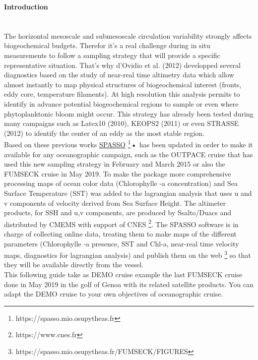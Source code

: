 \documentclass[12pt,a4paper]{article}
\begin{document}
{\textbf{\fontsize{19}{40}\selectfont Introduction}} \\
\\
\\
The horizontal mesoscale and submesoscale circulation variability strongly affects biogeochemical budgets. Therefor it's a real challenge during in situ measurements to follow a sampling strategy that will provide a specific representative situation. 
That's why d'Ovidio et al. (2012) developped several diagnostics based on the study of near-real time altimetry data which allow almost instantly to map physical structures of biogeochemical interest (fronts, eddy core, temperature filaments). At high resolution this analysis permits to identify in advance potential biogeochemical regions to sample or even where phytoplanktonic bloom might occur. This strategy has already been tested during many campaigns such as Latex10 (2010), KEOPS2 (2011) or even STRASSE (2012) to identify the center of an eddy as the most stable region.\\
Based on these previous works \href{https://spasso.mio.osupytheas.fr/}{SPASSO} \footnote{https://spasso.mio.osupytheas.fr}\textbf{•} has been updated in order to make it available for any oceanographic campaign, such as the OUTPACE cruise that has used this new sampling strategy in February and March 2015 or also the FUMSECK cruise in May 2019. To make the package more comprehensive processing maps of ocean color data (Chlorophylle -a concentration) and Sea Surface Temperature (SST) was added to the lagrangian analysis that uses u and v components of velocity derived from Sea Surface Height. The altimeter products, for SSH and u,v components, are produced by Ssalto/Duacs and distributed by CMEMS with support of CNES \footnote{https://www.cnes.fr}. The SPASSO software is in charge of collecting online data, treating them to make maps of the different parameters (Chlorophylle -a presence, SST and Chl-a, near-real time velocity maps, diagnostics for lagrangian analysis) and publish them on the web \footnote{https://spasso.mio.osupytheas.fr/FUMSECK/FIGURES} so that they will be available directly from the vessel. \\
This following guide take as DEMO cruise example the last FUMSECK cruise done in May 2019 in the golf of Genoa with its related satellite products. You can adapt the DEMO cruise to your own objectives of oceanographic cruise.
\newpage
\tableofcontents
\newpage
\end{document}
